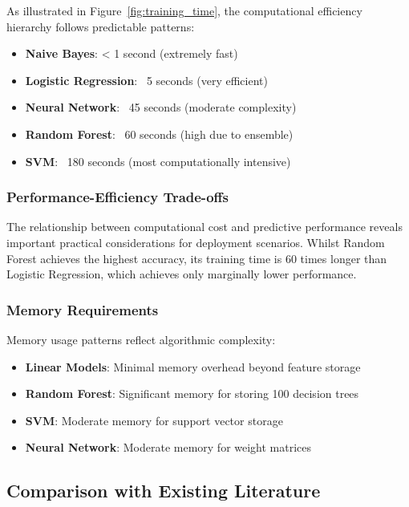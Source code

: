 \documentclass[11pt,a4paper]{article}
\begin{document}
As illustrated in Figure~\ref{fig:training_time}, the computational efficiency hierarchy follows predictable patterns:

\begin{itemize}
    \item \textbf{Naive Bayes}: < 1 second (extremely fast)
    \item \textbf{Logistic Regression}: ~5 seconds (very efficient)
    \item \textbf{Neural Network}: ~45 seconds (moderate complexity)
    \item \textbf{Random Forest}: ~60 seconds (high due to ensemble)
    \item \textbf{SVM}: ~180 seconds (most computationally intensive)
\end{itemize}

\subsubsection{Performance-Efficiency Trade-offs}

The relationship between computational cost and predictive performance reveals important practical considerations for deployment scenarios. Whilst Random Forest achieves the highest accuracy, its training time is 60 times longer than Logistic Regression, which achieves only marginally lower performance.

\subsubsection{Memory Requirements}

Memory usage patterns reflect algorithmic complexity:

\begin{itemize}
    \item \textbf{Linear Models}: Minimal memory overhead beyond feature storage
    \item \textbf{Random Forest}: Significant memory for storing 100 decision trees
    \item \textbf{SVM}: Moderate memory for support vector storage
    \item \textbf{Neural Network}: Moderate memory for weight matrices
\end{itemize}

\subsection{Comparison with Existing Literature}
\end{document}
